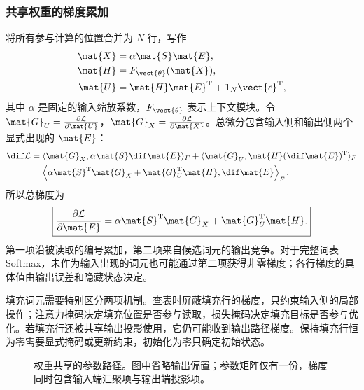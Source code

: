 \documentclass[../textbook.tex]{subfiles}
\begin{document}
\subsubsection{共享权重的梯度累加}
将所有参与计算的位置合并为 $N$ 行，写作
\begin{equation}
 \begin{aligned}
  \mat{X}&=\alpha \mat{S}\mat{E},\\
  \mat{H}&=F_{\vect{\theta}}(\mat{X}),\\
  \mat{U}&=\mat{H}\mat{E}^{\mathrm{T}}+\mathbf1_N\vect{c}^{\mathrm{T}},
 \end{aligned}
\end{equation}
其中 $\alpha$ 是固定的输入缩放系数，$F_{\vect{\theta}}$ 表示上下文模块。令 $\mat{G}_U=\frac{\partial\mathcal L}{\partial \mat{U}}$，$\mat{G}_X=\frac{\partial\mathcal L}{\partial \mat{X}}$。总微分包含输入侧和输出侧两个显式出现的 $\mat{E}$：
\begin{align}
 \dif\mathcal L
 &=\langle \mat{G}_X,\alpha \mat{S}\dif \mat{E}\rangle_F
   +\langle \mat{G}_U,\mat{H}(\dif \mat{E})^{\mathrm{T}}\rangle_F\\
 &=\left\langle\alpha \mat{S}^{\mathrm{T}}\mat{G}_X+\mat{G}_U^{\mathrm{T}}\mat{H},\dif \mat{E}\right\rangle_F.
\end{align}
所以总梯度为
\begin{equation}
 \boxed{\frac{\partial\mathcal L}{\partial \mat{E}}
 =\alpha \mat{S}^{\mathrm{T}}\mat{G}_X+\mat{G}_U^{\mathrm{T}}\mat{H}.}
 \label{eq:repr-tied-grad}
\end{equation}
第一项沿被读取的编号累加，第二项来自候选词元的输出竞争。对于完整词表 Softmax，未作为输入出现的词元也可能通过第二项获得非零梯度；各行梯度的具体值由输出误差和隐藏状态决定。

填充词元需要特别区分两项机制。查表时屏蔽填充行的梯度，只约束输入侧的局部操作；注意力掩码决定填充位置是否参与读取，损失掩码决定填充目标是否参与优化。若填充行还被共享输出投影使用，它仍可能收到输出路径梯度。保持填充行恒为零需要显式掩码或更新约束，初始化为零只确定初始状态。
\begin{figure}[htbp]
\centering
{}
\caption[权重共享的参数路径]{权重共享的参数路径。图中省略输出偏置；参数矩阵仅有一份，梯度同时包含输入端汇聚项与输出端投影项。}\label{fig:tok-weight-sharing}
\end{figure}
\end{document}
